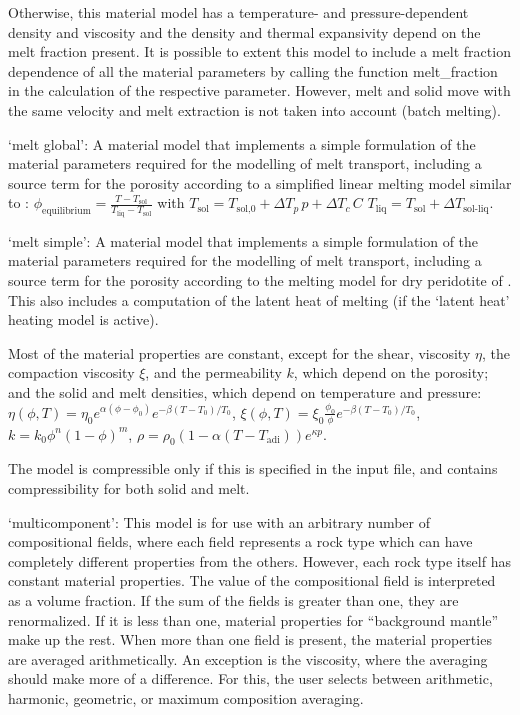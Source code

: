 \begin{itemize}
Otherwise, this material model has a temperature- and pressure-dependent density and viscosity and the density and thermal expansivity depend on the melt fraction present. It is possible to extent this model to include a melt fraction dependence of all the material parameters by calling the function melt\_fraction in the calculation of the respective parameter. However, melt and solid move with the same velocity and melt extraction is not taken into account (batch melting). 

`melt global': A material model that implements a simple formulation of the material parameters required for the modelling of melt transport, including a source term for the porosity according to a simplified linear melting model similar to \cite{schmeling2006}:
$\phi_{\text{equilibrium}} = \frac{T-T_{\text{sol}}}{T_{\text{liq}}-T_{\text{sol}}}$
with $T_{\text{sol}} = T_{\text{sol,0}} + \Delta T_p \, p + \Delta T_c \, C$ 
$T_{\text{liq}} = T_{\text{sol}}  + \Delta T_{\text{sol-liq}}$.

`melt simple': A material model that implements a simple formulation of the material parameters required for the modelling of melt transport, including a source term for the porosity according to the melting model for dry peridotite of \cite{KSL2003}. This also includes a computation of the latent heat of melting (if the `latent heat' heating model is active).

Most of the material properties are constant, except for the shear, viscosity $\eta$, the compaction viscosity $\xi$, and the permeability $k$, which depend on the porosity; and the solid and melt densities, which depend on temperature and pressure:
 $\eta(\phi,T) = \eta_0 e^{\alpha(\phi-\phi_0)} e^{-\beta(T-T_0)/T_0}$, $\xi(\phi,T) = \xi_0 \frac{\phi_0}{\phi} e^{-\beta(T-T_0)/T_0}$, $k=k_0 \phi^n (1-\phi)^m$, $\rho=\rho_0 (1 - \alpha (T - T_{\text{adi}})) e^{\kappa p}$.

The model is compressible only if this is specified in the input file, and contains compressibility for both solid and melt.

`multicomponent': This model is for use with an arbitrary number of compositional fields, where each field represents a rock type which can have completely different properties from the others. However, each rock type itself has constant material properties.  The value of the  compositional field is interpreted as a volume fraction. If the sum of the fields is greater than one, they are renormalized.  If it is less than one, material properties  for ``background mantle'' make up the rest. When more than one field is present, the material properties are averaged arithmetically.  An exception is the viscosity, where the averaging should make more of a difference.  For this, the user selects between arithmetic, harmonic, geometric, or maximum composition averaging.


\end{itemize}
